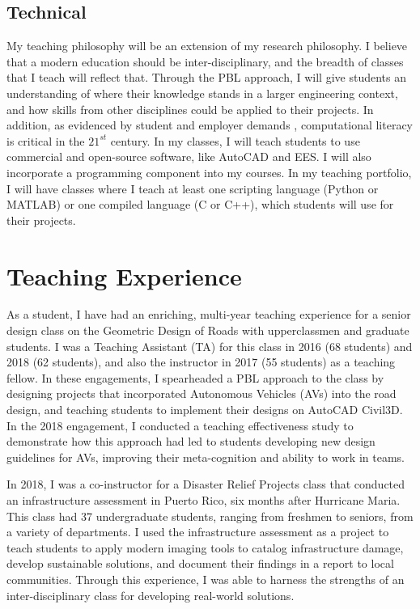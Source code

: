 \documentclass[12pt]{article}
\begin{document}
\subsection*{Technical}  
My teaching philosophy will be an extension of my research philosophy. I believe that a modern education should be inter-disciplinary, and the breadth of classes that I teach will reflect that. Through the PBL approach, I will give students an understanding of where their knowledge stands in a larger engineering context, and how skills from other disciplines could be applied to their projects. In addition, as evidenced by student and employer demands \cite{magana2012motivation}, computational literacy is critical in the $21^{st}$ century. In my classes, I will teach students to use commercial and open-source software, like AutoCAD and EES. I will also incorporate a programming component into my courses. In my teaching portfolio, I will have classes where I teach at least one scripting language (Python or MATLAB) or one compiled language (C or C++), which students will use for their projects. 

\section*{Teaching Experience}
As a student, I have had an enriching, multi-year teaching experience for a senior design class on the Geometric Design of Roads with upperclassmen and graduate students. I was a Teaching Assistant (TA) for this class in 2016 (68 students) and 2018 (62 students), and also the instructor in 2017 (55 students) as a teaching fellow. In these engagements, I spearheaded a PBL approach to the class by designing projects that incorporated Autonomous Vehicles (AVs) into the road design, and teaching students to implement their designs on AutoCAD Civil3D. In the 2018 engagement, I conducted a teaching effectiveness study to demonstrate how this approach had led to students developing new design guidelines for AVs, improving their meta-cognition and ability to work in teams.

In 2018, I was a co-instructor for a Disaster Relief Projects class that conducted an infrastructure assessment in Puerto Rico, six months after Hurricane Maria. This class had 37 undergraduate students, ranging from freshmen to seniors, from a variety of departments. I used the infrastructure assessment as a project to teach students to apply modern imaging tools to catalog infrastructure damage, develop sustainable solutions, and document their findings in a report to local communities. Through this experience, I was able to harness the strengths of an inter-disciplinary class for developing real-world solutions. 
\end{document}
